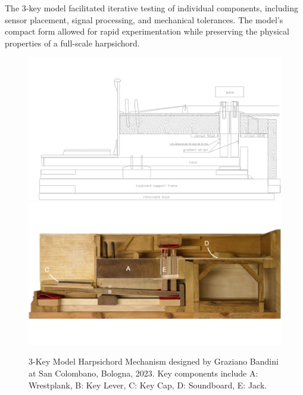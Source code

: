 The 3-key model facilitated iterative testing of individual components, including sensor placement, signal processing, and mechanical tolerances. The model’s compact form allowed for rapid experimentation while preserving the physical properties of a full-scale harpsichord.

\begin{figure}
    \centering
    \includegraphics[width=\linewidth]{src/images/CrossSectionSensorPlacement.jpg}
    \\
    \includegraphics[width=\linewidth]{src/images/3-key-side-labelled.png}
    \caption{3-Key Model Harpsichord Mechanism designed by Graziano Bandini at San Colombano, Bologna, 2023. Key components include A: Wrestplank, B: Key Lever, C: Key Cap, D: Soundboard, E: Jack.}
    \label{fig:3key}
\end{figure}


